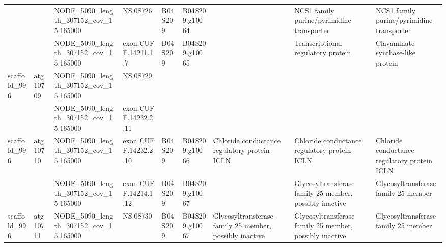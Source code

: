 \begin{longtable}{lllllllll}
                &           &   NODE\_5090\_length\_307152\_cov\_15.165000 &              NS.08726 &      B04S209 &  B04S209.g10064 &                                                                                 &                                       NCS1 family purine/pyrimidine transporter &                                       NCS1 family purine/pyrimidine transporter \\
                &           &   NODE\_5090\_length\_307152\_cov\_15.165000 &   exon.CUFF.14211.1.7 &      B04S209 &  B04S209.g10065 &                                                                                 &                                              Transcriptional regulatory protein &                                               Clavaminate synthase-like protein \\
   scaffold\_996 &  atg10709 &   NODE\_5090\_length\_307152\_cov\_15.165000 &              NS.08729 &              &                 &                                                                                 &                                                                                 &                                                                                 \\
                &           &   NODE\_5090\_length\_307152\_cov\_15.165000 &  exon.CUFF.14232.2.11 &              &                 &                                                                                 &                                                                                 &                                                                                 \\
   scaffold\_996 &  atg10710 &   NODE\_5090\_length\_307152\_cov\_15.165000 &  exon.CUFF.14232.2.10 &      B04S209 &  B04S209.g10066 &                                    Chloride conductance regulatory protein ICLN &                                    Chloride conductance regulatory protein ICLN &                                    Chloride conductance regulatory protein ICLN \\
                &           &   NODE\_5090\_length\_307152\_cov\_15.165000 &  exon.CUFF.14214.1.12 &      B04S209 &  B04S209.g10067 &                                                                                 &                         Glycosyltransferase family 25 member, possibly inactive &                                            Glycosyltransferase family 25 member \\
   scaffold\_996 &  atg10711 &   NODE\_5090\_length\_307152\_cov\_15.165000 &              NS.08730 &      B04S209 &  B04S209.g10067 &                         Glycosyltransferase family 25 member, possibly inactive &                         Glycosyltransferase family 25 member, possibly inactive &                                            Glycosyltransferase family 25 member \\

\end{longtable}
